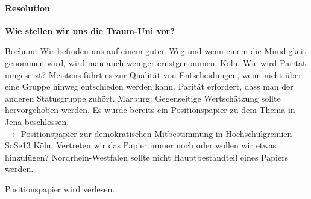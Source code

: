     \paragraph{Resolution}
      \textbf{Wie stellen wir uns die Traum-Uni vor?} \\
      \begin{outline}
        \1 Bochum: Wir befinden uns auf einem guten Weg und wenn einem die Mündigkeit genommen wird, wird man auch weniger ernstgenommen.
        \1 Köln: Wie wird Parität umgesetzt? Meistens führt es zur Qualität von Entscheidungen, wenn nicht über eine Gruppe hinweg entschieden werden kann. Parität erfordert, dass man der anderen Statusgruppe zuhört.
        \1 Marburg: Gegenseitige Wertschätzung sollte hervorgehoben werden.
        \1 Es wurde bereits ein Positionspapier zu dem Thema in Jena beschlossen. \\
          $\rightarrow$ Positionspapier zur demokratischen Mitbestimmung in Hochschulgremien SoSe13 %
        \1 Köln: Vertreten wir das Papier immer noch oder wollen wir etwas hinzufügen?
        \1 Nordrhein-Westfalen sollte nicht Hauptbestandteil eines Papiers werden.
      \end{outline}
      Positionspapier wird verlesen.
